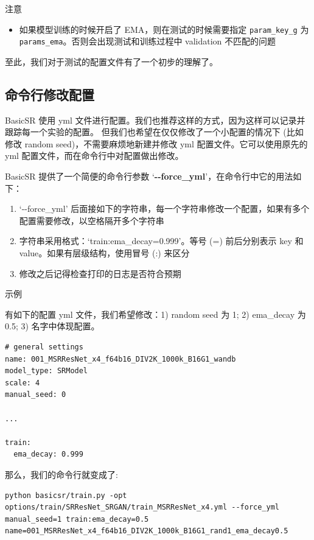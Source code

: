 \documentclass[../main.tex]{subfiles}
\begin{document}
\begin{exampleBox}[righthand ratio=0.00, sidebyside, sidebyside align=center, lower separated=false]{注意}
    \begin{itemize}
        \item 如果模型训练的时候开启了 EMA，则在测试的时候需要指定 \texttt{param\_key\_g} 为 \texttt{params\_ema}。否则会出现测试和训练过程中 validation 不匹配的问题
    \end{itemize}
\end{exampleBox}

至此，我们对于测试的配置文件有了一个初步的理解了。

\subsection{命令行修改配置}\label{code_structure:yml_modification_with_commands}

BasicSR 使用 yml 文件进行配置。我们也推荐这样的方式，因为这样可以记录并跟踪每一个实验的配置。
但我们也希望在仅仅修改了一个小配置的情况下 (比如修改 random seed)，不需要麻烦地新建并修改 yml 配置文件。它可以使用原先的 yml 配置文件，而在命令行中对配置做出修改。

BasicSR 提供了一个简便的命令行参数 ‘\textbf{-{}-force\_yml}’，在命令行中它的用法如下：

\begin{enumerate}
    \item ‘-{}-force\_yml’ 后面接如下的字符串，每一个字符串修改一个配置，如果有多个配置需要修改，以空格隔开多个字符串
    \item 字符串采用格式：‘train:ema\_decay=0.999’。等号 (=) 前后分别表示 key 和 value。如果有层级结构，使用冒号 (:) 来区分
    \item 修改之后记得检查打印的日志是否符合预期
\end{enumerate}

\begin{exampleBox}[]{示例}

    有如下的配置 yml 文件，我们希望修改：1) random seed 为 1; 2) ema\_decay 为0.5; 3) 名字中体现配置。

    \begin{verbatim}
# general settings
name: 001_MSRResNet_x4_f64b16_DIV2K_1000k_B16G1_wandb
model_type: SRModel
scale: 4
manual_seed: 0

...

train:
  ema_decay: 0.999
    \end{verbatim}

    那么，我们的命令行就变成了:
    \begin{verbatim}
python basicsr/train.py -opt options/train/SRResNet_SRGAN/train_MSRResNet_x4.yml --force_yml manual_seed=1 train:ema_decay=0.5 name=001_MSRResNet_x4_f64b16_DIV2K_1000k_B16G1_rand1_ema_decay0.5
    \end{verbatim}
\end{exampleBox}
\end{document}
